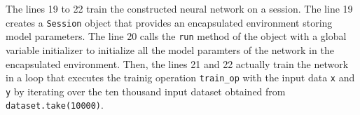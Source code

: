 The lines 19 to 22 train the constructed neural network on a session.
The line 19 creates a {\tt Session} object that provides an encapsulated
environment storing model parameters.
The line 20 calls the {\tt run} method of the object with a global variable
initializer to initialize all the model paramters of the network in the
encapsulated environment.
Then, the lines 21 and 22 actually train the network in a loop that executes
the trainig operation {\tt train\_op} with the input data {\tt x} and {\tt y}
by iterating over the ten thousand input dataset obtained from {\tt
dataset.take(10000)}.

